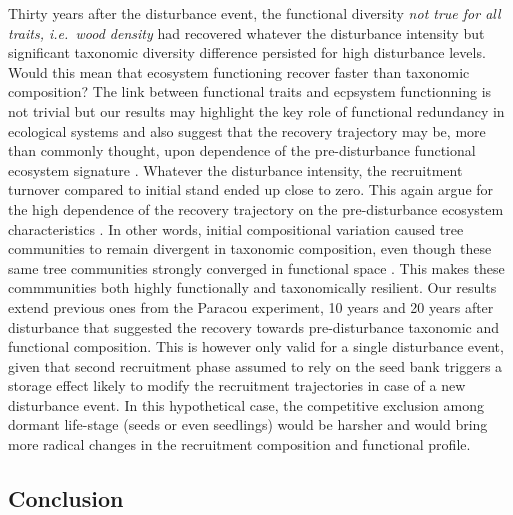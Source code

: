 \documentclass[fleqn,10pt]{ArtEcoFoG} %
\begin{document}
Thirty years after the disturbance event, the functional diversity
\emph{not true for all traits, i.e.~wood density} had recovered whatever
the disturbance intensity but significant taxonomic diversity difference
persisted for high disturbance levels. Would this mean that ecosystem
functioning recover faster than taxonomic composition? The link between
functional traits and ecpsystem functionning is not trivial but our
results may highlight the key role of functional redundancy in
ecological systems and also suggest that the recovery trajectory may be,
more than commonly thought, upon dependence of the pre-disturbance
functional ecosystem signature \citep{Herault2018}. Whatever the
disturbance intensity, the recruitment turnover compared to initial
stand ended up close to zero. This again argue for the high dependence
of the recovery trajectory on the pre-disturbance ecosystem
characteristics \citep{Anderson2007}. In other words, initial
compositional variation caused tree communities to remain divergent in
taxonomic composition, even though these same tree communities strongly
converged in functional space \citep{Fukami2005}. This makes these
commmunities both highly functionally and taxonomically resilient. Our
results extend previous ones from the Paracou experiment, 10 years
\citep{Molino2001} and 20 years \citep{Baraloto2012a} after disturbance
that suggested the recovery towards pre-disturbance taxonomic and
functional composition. This is however only valid for a single
disturbance event, given that second recruitment phase assumed to rely
on the seed bank triggers a storage effect likely to modify the
recruitment trajectories in case of a new disturbance event. In this
hypothetical case, the competitive exclusion among dormant life-stage
(seeds or even seedlings) would be harsher and would bring more radical
changes in the recruitment composition and functional profile.

\subsection{Conclusion}\label{conclusion}
\end{document}

